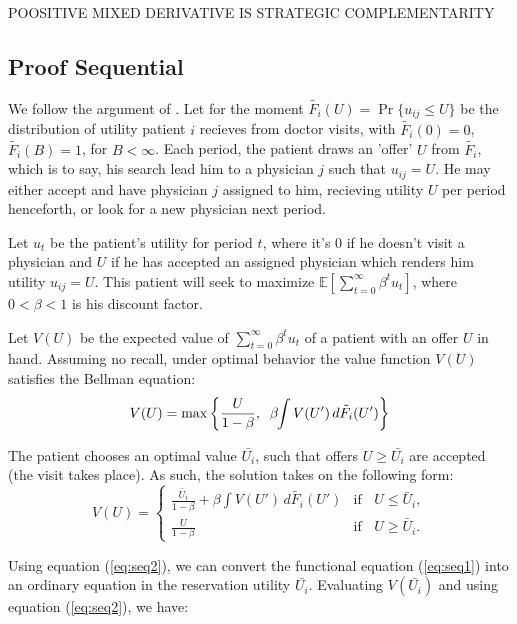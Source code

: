 \documentclass[../main.tex]{subfiles}
\begin{document}
POOSITIVE MIXED DERIVATIVE IS STRATEGIC COMPLEMENTARITY

\subsection{Proof Sequential}

We follow the argument of \cite{sargent}. Let for the moment $\tilde{F_i}(U) = \operatorname{Pr}\{u_{ij} \leq U\}$ be the distribution of utility patient $i$ recieves from doctor visits, with $\tilde{F_i}(0) = 0$, $\tilde{F_i}(B) = 1$, for $B < \infty$. Each period, the patient draws an 'offer' $U$ from $\tilde{F_i}$, which is to say, his search lead him to a physician $j$ such that $u_{ij} = U$. He may either accept and have physician $j$ assigned to him, recieving utility $U$ per period henceforth, or look for a new physician next period.

Let $u_t$ be the patient's utility for period $t$, where it's $0$ if he doesn't visit a physician and $U$ if he has accepted an assigned physician which renders him utility $u_{ij} = U$. This patient will seek to maximize $\mathbb{E}[\sum_{t=0}^{\infty} \beta^t u_t]$, where $0 < \beta < 1$ is his discount factor.

Let $V(U)$ be the expected value of $\sum_{t=0}^{\infty} \beta^t u_t$ of a patient with an offer $U$ in hand. Assuming no recall, under optimal behavior the value function $V(U)$ satisfies the Bellman equation:
\begin{equation}
    V(U) = \max \left\{ \frac{U}{1 - \beta},\; \;\beta \hspace{-0.1cm}\int V(U') \, d \tilde{F_i}(U') \right\}
    \label{eq:seq1} 
\end{equation}

The patient chooses an optimal value $\bar{U_i}$, such that offers $U \geq \bar{U_i}$ are accepted (the visit takes place). As such, the solution takes on the following form:
\begin{equation}
    V(U) = \begin{cases}
        \frac{\bar{U}_i}{1 - \beta} + \beta \int V(U') \, d \tilde{F_i}(U') & \text{if }\; \; U \leq \bar{U}_i, \\[0.5em]
        \frac{U}{1 - \beta} & \text{if } \; \; U \geq \bar{U}_i.
    \end{cases}
\label{eq:seq2} 
\end{equation}

Using equation (\ref{eq:seq2}), we can convert the functional equation (\ref{eq:seq1}) into an ordinary equation in the reservation utility $\bar{U_i}$. Evaluating $V(\bar{U_i})$ and using equation (\ref{eq:seq2}), we have:
\end{document}
